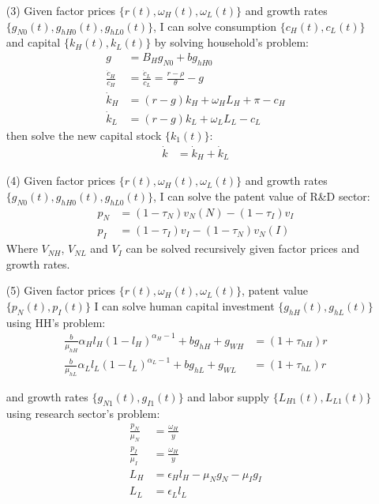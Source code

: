 \documentclass[12pt]{article}
\begin{document}
\begin{appendices}
\begin{itemize}
\item[(3)] Given factor prices $\{r(t),\omega_H(t),\omega_L(t)\}$ and growth rates $\{g_{N0}(t),g_{hH0}(t),g_{hL0}(t)\}$, I can solve consumption $\{c_H(t),c_L(t)\}$ and capital $\{k_H(t),k_L(t)\}$ by solving household's problem:
\begin{align*}
g &= B_Hg_{N0}+bg_{hH0} \\
\frac{\dot{c}_H}{c_H} &= \frac{\dot{c}_L}{c_L} = \frac{r-\rho}{\theta}-g \\
\dot{k}_H &= (r-g)k_H+\omega_HL_H+\pi-c_H \\
\dot{k}_L &=  (r-g)k_L+\omega_L L_L-c_L
\end{align*}
then solve the new capital stock $\{k_1(t)\}$:
\begin{align*}
\dot{k} &= \dot{k}_H+ \dot{k}_L
\end{align*}

\item[(4)] Given factor prices $\{r(t),\omega_H(t),\omega_L(t)\}$ and growth rates $\{g_{N0}(t),g_{hH0}(t),g_{hL0}(t)\}$, I can solve the patent value of R\&D sector:
\begin{align*}
p_N &= (1-\tau_N)v_N(N)-(1-\tau_I)v_I\\
p_I &= (1-\tau_I)v_I-(1-\tau_N)v_N(I) 
\end{align*}
Where $V_{NH}$, $V_{NL}$ and $V_I$ can be solved recursively given factor prices and growth rates. 


\item[(5)] Given factor prices $\{r(t),\omega_H(t),\omega_L(t)\}$, patent value $\{p_N(t),p_I(t)\}$ I can solve human capital investment $\{g_{hH}(t), g_{hL}(t)\}$ using HH's problem:
\begin{align*}
\frac{b}{\mu_{hH}}\alpha_Hl_H(1-l_H)^{\alpha_H-1}+bg_{hH}+g_{WH} &= (1+\tau_{hH})r\\
\frac{b}{\mu_{hL}}\alpha_Ll_L(1-l_L)^{\alpha_L-1}+bg_{hL}+g_{WL} &= (1+\tau_{hL})r
\end{align*}

and growth rates $\{g_{N1}(t), g_{I1}(t)\}$ and labor supply $\{L_{H1}(t), L_{L1}(t)\}$ using research sector's problem: 
\begin{align*}
\frac{p_N}{\mu_N} &= \frac{\omega_H}{y}  \\
\frac{p_I}{\mu_I} &= \frac{\omega_H}{y}  \\
L_H &=\epsilon_H l_H-\mu_Ng_N-\mu_Ig_I \\
L_L &=\epsilon_L l_L
\end{align*}


\end{itemize}
\end{appendices}
\end{document}
